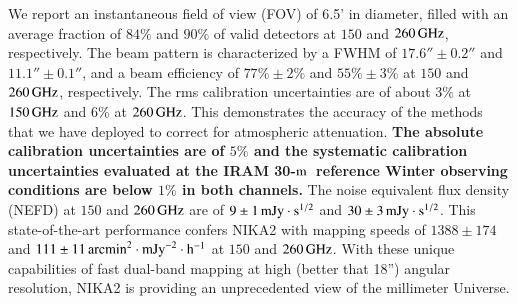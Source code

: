 \documentclass[traditionalabstract]{aa}
\newcommand{\trentemetre}{30-$\rm{m}$}
\newcommand{\lp}[1]{\bf \color[RGB]{230, 0, 92} #1}
\begin{document}
       {We report an instantaneous field of view (FOV) of 6.5'
         in diameter, filled with an average fraction of $84\%$ and 
         $90\%$ of %
         valid detectors
         at $150$ and $260\,\rm{GHz}$, respectively. The beam pattern
         is characterized by a FWHM of $17.6'' \pm 0.2''$
         and  $11.1''\pm 0.1''$, and a beam efficiency of
         $77\% \pm 2\%$ and $55\% \pm 3\%$
         at $150$ and $260\,\rm{GHz}$, respectively.
         The rms calibration uncertainties are of about $3\%$ at $150\,\rm{GHz}$ 
         and $6\%$ at $260\,\rm{GHz}$. This demonstrates
         the accuracy of the methods that we have deployed to correct
         for atmospheric attenuation. {\lp The absolute
           calibration uncertainties are of $5\%$ and the systematic
           calibration uncertainties evaluated at the IRAM
           \trentemetre\ reference Winter observing conditions are
           below $1\%$ in both channels.}
         The noise equivalent
         flux density (NEFD) at $150$ and $260\,\rm{GHz}$ are of
         $9 \pm 1\, \rm{mJy}\cdot s^{1/2}$ and
         $30 \pm 3\, \rm{mJy}\cdot s^{1/2}$. 
         This state-of-the-art performance confers NIKA2 with
         mapping speeds of $1388 \pm 174$ and
         $111 \pm 11 \, \rm{arcmin}^2\cdot \rm{mJy}^{-2}\cdot
         \rm{h}^{-1}$
         at $150$ and $260\,\rm{GHz}$.}
       {With these unique capabilities of fast dual-band mapping at
         high (better that 18'') angular resolution, NIKA2 is providing an unprecedented view
         of the millimeter Universe.}
       
       
   \maketitle
\end{document}
